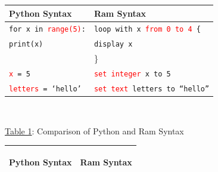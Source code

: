 \documentclass[11pt]{article}
\newcommand{\red}[1]{\textcolor{red}{#1}}
\begin{document}
\begin{center}
    \begin{spacing}{1.1}
    
        \hypertarget{tab1}{}
    
        \begin{tabular}{|l|l|} 
             \hline
             
             \textbf{Python Syntax} & \textbf{Ram Syntax} \\ 
             
             \hline
             \texttt{for x in \red{range(5)}:} & \texttt{loop with x \red{from 0 to 4} \{ } \\ 
             \quad \quad \texttt{print(x)} & \quad \quad  \texttt{display x} \\
              & \} \\
             
             \hline
             
             \texttt{\red{x} = 5} & \texttt{\red{set integer} x to 5} \\
             
             \hline
             
             \texttt{\red{letters} = `hello'} & \texttt{\red{set text} letters to ``hello''} \\
             
             \hline
             
        \end{tabular}
        
        $ $
        
        \small{\hyperlink{tab1}{Table 1}: Comparison of Python and Ram Syntax}
             
        \begin{tabular}{|l|l|} 
             \hline \hypertarget{tab2}{}
             
             \textbf{Python Syntax} & \textbf{Ram Syntax} \\ 
             
             \hline
             
              

\end{tabular}
\end{spacing}
\end{center}
\end{document}
